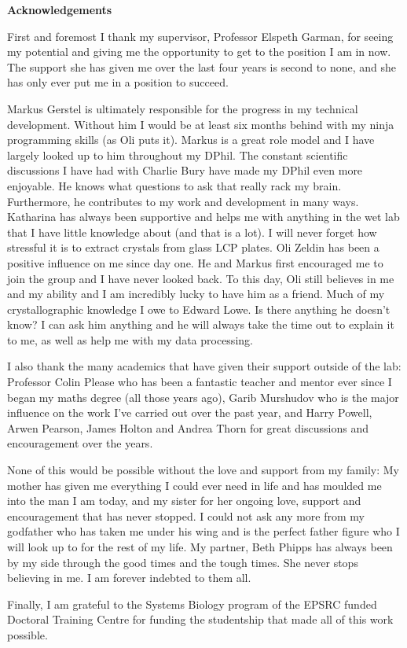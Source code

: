 \newenvironment{acknowledgements}%
{\clearpage\thispagestyle{empty}\vfill\begin{center}%
\bfseries Acknowledgements\end{center}}%
{\vfill}
\begin{acknowledgements}
\small
\singlespacing
First and foremost I thank my supervisor, Professor Elspeth Garman, for seeing my potential and giving me the opportunity to get to the position I am in now.
The support she has given me over the last four years is second to none, and she has only ever put me in a position to succeed.

Markus Gerstel is ultimately responsible for the progress in my technical development.
Without him I would be at least six months behind with my ninja programming skills (as Oli puts it).
Markus is a great role model and I have largely looked up to him throughout my DPhil.
The constant scientific discussions I have had with Charlie Bury have made my DPhil even more enjoyable.
He knows what questions to ask that really rack my brain.
Furthermore, he contributes to my work and development in many ways.
Katharina has always been supportive and helps me with anything in the wet lab that I have little knowledge about (and that is a lot).
I will never forget how stressful it is to extract crystals from glass LCP plates.
Oli Zeldin has been a positive influence on me since day one.
He and Markus first encouraged me to join the group and I have never looked back.
To this day, Oli still believes in me and my ability and I am incredibly lucky to have him as a friend.
Much of my crystallographic knowledge I owe to Edward Lowe.
Is there anything he doesn't know?
I can ask him anything and he will always take the time out to explain it to me, as well as help me with my data processing.

I also thank the many academics that have given their support outside of the lab:
Professor Colin Please who has been a fantastic teacher and mentor ever since I began my maths degree (all those years ago), Garib Murshudov who is the major influence on the work I've carried out over the past year, and Harry Powell, Arwen Pearson, James Holton and Andrea Thorn for great discussions and encouragement over the years.

None of this would be possible without the love and support from my family:
My mother has given me everything I could ever need in life and has moulded me into the man I am today, and my sister for her ongoing love, support and encouragement that has never stopped.
I could not ask any more from my godfather who has taken me under his wing and is the perfect father figure who I will look up to for the rest of my life.
My partner, Beth Phipps has always been by my side through the good times and the tough times.
She never stops believing in me.
I am forever indebted to them all.

Finally, I am grateful to the Systems Biology program of the EPSRC funded Doctoral Training Centre for funding the studentship that made all of this work possible.
\end{acknowledgements}
